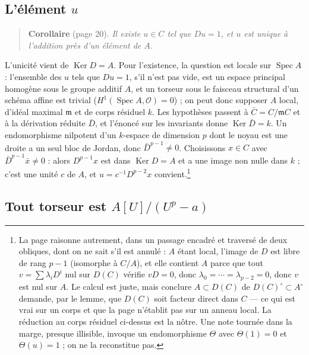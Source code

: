 \documentclass[11pt,a4paper]{article}
\begin{document}
\subsection*{L'élément $u$}

\begin{quote}
\textbf{Corollaire} (page 20). \emph{Il existe $u \in C$ tel que $Du = 1$,
et $u$ est unique à l'addition près d'un élément de $A$.}
\end{quote}

L'unicité vient de $\operatorname{Ker} D = A$. Pour l'existence, la question
est locale sur $\operatorname{Spec} A$ : l'ensemble des $u$ tels que
$Du = 1$, s'il n'est pas vide, est un espace principal homogène sous le
groupe additif $A$, et un torseur sous le faisceau structural d'un schéma
affine est trivial ($H^1(\operatorname{Spec} A, \mathcal{O}) = 0$) ; on peut
donc supposer $A$ local, d'idéal maximal $\mathfrak{m}$ et de corps résiduel
$k$. Les hypothèses passent à $\bar C = C / \mathfrak{m} C$ et à la dérivation
réduite $\bar D$, et l'énoncé sur les invariants donne
$\operatorname{Ker}\bar D = k$. Un endomorphisme nilpotent d'un $k$-espace de
dimension $p$ dont le noyau est une droite a un seul bloc de Jordan, donc
$\bar D^{p-1} \neq 0$. Choisissons $x \in C$ avec $\bar D^{p-1} \bar x \neq
0$ : alors $D^{p-1} x$ est dans $\operatorname{Ker} D = A$ et a une image non
nulle dans $k$ ; c'est une unité $c$ de $A$, et $u = c^{-1} D^{p-2} x$
convient.\footnote{La page raisonne autrement, dans un passage encadré et
traversé de deux obliques, dont on ne sait s'il est annulé : $A$ étant local,
l'image de $D$ est libre de rang $p - 1$ (isomorphe à $C/A$), et elle
contient $A$ parce que tout $v = \sum \lambda_i D^i$ nul sur $D(C)$ vérifie
$vD = 0$, donc $\lambda_0 = \cdots = \lambda_{p-2} = 0$, donc $v$ est nul
sur $A$. Le calcul est juste, mais conclure $A \subset D(C)$ de
$D(C)^{\circ} \subset A^{\circ}$ demande, par le lemme, que $D(C)$ soit
facteur direct dans $C$ --- ce qui est vrai sur un corps et que la page
n'établit pas sur un anneau local. La réduction au corps résiduel ci-dessus
est la nôtre. Une note tournée dans la marge, presque illisible, invoque un
endomorphisme $\Theta$ avec $\Theta(1) = 0$ et $\Theta(u) = 1$ ; on ne la
reconstitue pas.}

\subsection*{Tout torseur est $A[U]/(U^p - a)$}
\end{document}
